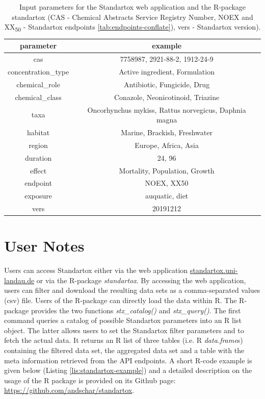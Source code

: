 \documentclass[journal,datadescriptor,accept,moreauthors,pdftex]{Definitions/mdpi}
\begin{document}
\begin{table}[H]
    \caption{Input parameters for the Standartox web application and the R-package standartox (CAS - Chemical Abstracts Service Registry Number, NOEX and XX\textsubscript{50} - Standartox endpoints \ref{tab:endpoints-conflate}), vers - Standartox version).}
    \label{tab:app-parameters}
    \centering
    \begin{tabular}{cc}
    \toprule
    \textbf{parameter} & \textbf{example} \\ 
    \midrule
    cas & 7758987, 2921-88-2, 1912-24-9 \\
    concentration\_type & Active ingredient, Formulation \\
    chemical\_role & Antibiotic, Fungicide, Drug \\
    chemical\_class & Conazole, Neonicotinoid, Triazine \\
    taxa & Oncorhynchus mykiss, Rattus norvegicus, Daphnia magna \\
    habitat & Marine, Brackish, Freshwater \\
    region & Europe, Africa, Asia \\
    duration & 24, 96 \\
    effect & Mortality, Population, Growth \\
    endpoint & NOEX, XX50 \\
    exposure & auquatic, diet \\
    vers & 20191212 \\
    \bottomrule
\end{tabular}
\end{table}

\section{User Notes}
Users can access Standartox either via the web application \url{standartox.uni-landau.de} or via the R-package \textit{standartox}. By accessing the web application, users can filter and download the resulting data sets as a comma-separated values (csv) file. Users of the R-package can directly load the data within R. The R-package provides the two functions \textit{stx\_catalog()} and \textit{stx\_query()}. The first command queries a catalog of possible Standartox parameters into an R list object. The latter allows users to set the Standartox filter parameters and to fetch the actual data. It returns an R list of three tables (i.e. R \textit{data.frame}s) containing the filtered data set, the aggregated data set and a table with the meta information retrieved from the API endpoints. A short R-code example is given below (Listing \ref{lis:standartox-example}) and a detailed description on the usage of the R package is provided on its Github page: \url{https://github.com/andschar/standartox}.
\end{document}
